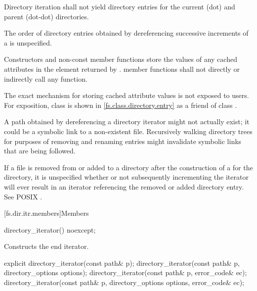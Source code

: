 \pnum
Directory iteration shall not yield directory entries for the current (dot)
and parent (dot-dot) directories.

\pnum
The order of directory entries obtained by dereferencing successive
increments of a  is unspecified.

\pnum
Constructors and non-const  member functions
store the values of any cached attributes
in the  element returned by .
 member functions shall not directly or indirectly call
any   function.
\begin{note}
The exact mechanism for storing cached attribute values is not exposed to users.
For exposition, class  is shown in \ref{fs.class.directory.entry}
as a friend of class .
\end{note}

\pnum
\begin{note}
A path obtained by dereferencing a directory iterator might not actually exist;
it could be a symbolic link to a non-existent file.
Recursively walking directory trees
for purposes of removing and renaming entries
might invalidate symbolic links that are being followed.
\end{note}

\pnum
\begin{note}
If a file  is removed from or added to a directory after the
construction of a  for the directory, it is
unspecified whether or not subsequently incrementing the iterator will ever
result in an iterator referencing the removed or added directory entry. See
POSIX .
\end{note}

[fs.dir.itr.members]{Members}

%
\begin{itemdecl}
directory_iterator() noexcept;
\end{itemdecl}

\begin{itemdescr}
\pnum
\effects
Constructs the end iterator.
\end{itemdescr}

%
\begin{itemdecl}
explicit directory_iterator(const path& p);
directory_iterator(const path& p, directory_options options);
directory_iterator(const path& p, error_code& ec);
directory_iterator(const path& p, directory_options options, error_code& ec);
\end{itemdecl}

